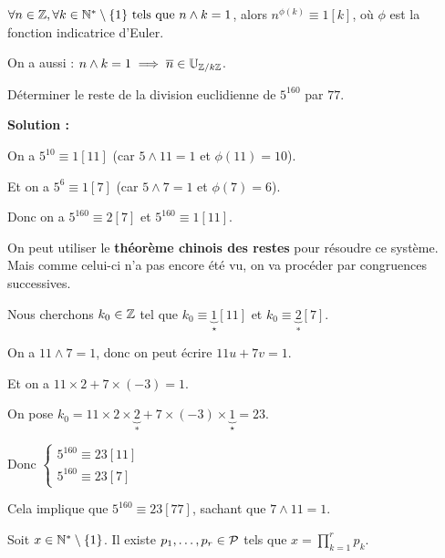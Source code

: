 \documentclass[12pt, a4paper]{report}
\begin{document}
\begin{remark}
    $\forall n \in \mathbb{Z}, \forall k \in \mathbb{N}^*\setminus\{1\} \text{ tels que } n \wedge k =1$, alors $n^{\phi(k)} \equiv 1 [k]$, où $\phi$ est la fonction indicatrice d'Euler.

    On a aussi : $n\wedge k = 1 \implies \overline{n} \in \mathbb{U}_{\mathbb{Z}/k\mathbb{Z}}$.
\end{remark}

\begin{exercise}
    Déterminer le reste de la division euclidienne de $5^{160}$ par $77$.

    \textbf{Solution :}

    On a $5^{10} \equiv 1[11]$ (car $5 \wedge 11 = 1$ et $\phi(11) = 10$).

    Et on a $5^6 \equiv 1[7]$ (car $5 \wedge 7 = 1$ et $\phi(7) = 6$).

    Donc on a $5^{160} \equiv 2 [7]$ et $5^{160} \equiv 1 [11]$.

    On peut utiliser le \textbf{théorème chinois des restes} pour résoudre ce système. Mais comme celui-ci n'a pas encore été vu, on va procéder par congruences successives.


    Nous cherchons $k_0 \in \mathbb{Z}$ tel que $k_0 \equiv \underbrace{1}_{\star}[11]$ et $k_0 \equiv \underbrace{2}_{*}[7]$.

    On a $11\wedge 7 = 1$, donc on peut écrire $11u + 7v = 1$.

    Et on a $11 \times 2 + 7 \times (-3) = 1$.

    On pose $k_0 = 11 \times 2 \times \underbrace{2}_{*} + 7 \times (-3) \times \underbrace{1}_{\star} = 23$.

    Donc $\begin{cases} 5^{160} \equiv 23[11] \\ 5^{160} \equiv 23[7] \end{cases}$

    Cela implique que $5^{160} \equiv 23 [77]$, sachant que $7\wedge 11 =1$.

\end{exercise}

\begin{theorem}
    Soit $x \in \mathbb{N}^*\setminus\{1\}$. Il existe $p_1,\dots,p_r \in \mathcal{P}$ tels que $x=\prod_{k=1}^{r}p_k$.
\end{theorem}
\end{document}
